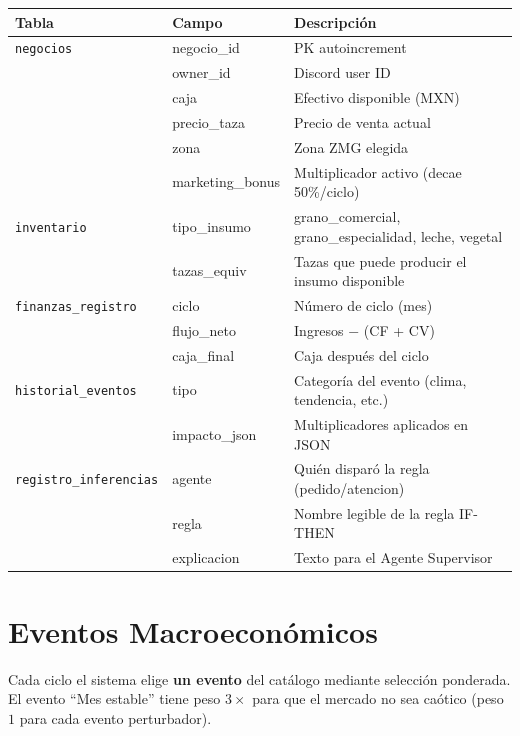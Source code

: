 \documentclass[12pt, a4paper]{article}
\begin{document}
\begin{longtable}{lll}
  \toprule
  \textbf{Tabla} & \textbf{Campo} & \textbf{Descripción} \\
  \midrule
  \endhead
  \texttt{negocios} & negocio\_id & PK autoincrement \\
  & owner\_id & Discord user ID \\
  & caja & Efectivo disponible (MXN) \\
  & precio\_taza & Precio de venta actual \\
  & zona & Zona ZMG elegida \\
  & marketing\_bonus & Multiplicador activo (decae 50\%/ciclo) \\
  \addlinespace
  \texttt{inventario} & tipo\_insumo & grano\_comercial, grano\_especialidad, leche, vegetal \\
  & tazas\_equiv & Tazas que puede producir el insumo disponible \\
  \addlinespace
  \texttt{finanzas\_registro} & ciclo & Número de ciclo (mes) \\
  & flujo\_neto & Ingresos $-$ (CF + CV) \\
  & caja\_final & Caja después del ciclo \\
  \addlinespace
  \texttt{historial\_eventos} & tipo & Categoría del evento (clima, tendencia, etc.) \\
  & impacto\_json & Multiplicadores aplicados en JSON \\
  \addlinespace
  \texttt{registro\_inferencias} & agente & Quién disparó la regla (pedido/atencion) \\
  & regla & Nombre legible de la regla IF-THEN \\
  & explicacion & Texto para el Agente Supervisor \\
  \bottomrule
\end{longtable}

\section{Eventos Macroeconómicos}

Cada ciclo el sistema elige \textbf{un evento} del catálogo mediante selección
ponderada. El evento ``Mes estable'' tiene peso $3\times$ para que el mercado
no sea caótico (peso $1$ para cada evento perturbador).
\end{document}
